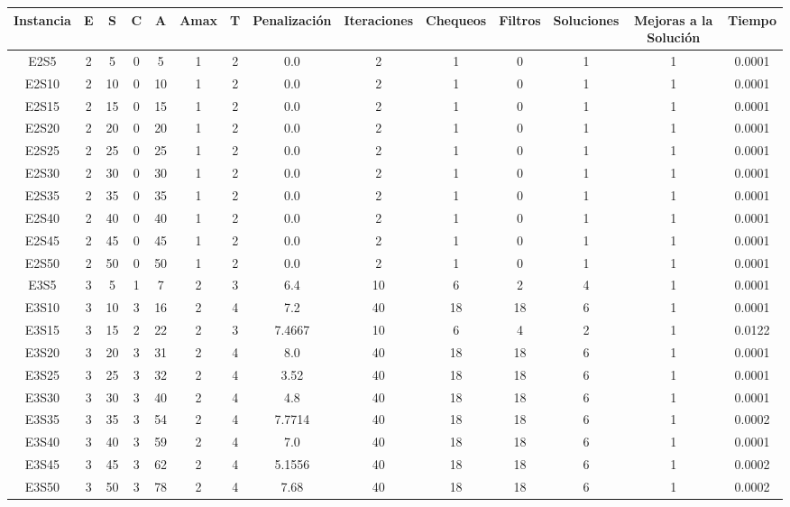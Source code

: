 \documentclass[letter, 10pt]{article}
\begin{document}
\begin{landscape}
\begin{longtable}{|c|c|c|c|c|c|c|c|c|c|c|c|c|c|}

Instancia & E & S & C & A & Amax & T & Penalización & Iteraciones & Chequeos & Filtros & Soluciones & Mejoras a la Solución & Tiempo \\
\hline
E2S5 & 2 & 5 & 0 & 5 & 1 & 2 & 0.0 & 2 & 1 & 0 & 1 & 1 & 0.0001 \\
E2S10 & 2 & 10 & 0 & 10 & 1 & 2 & 0.0 & 2 & 1 & 0 & 1 & 1 & 0.0001 \\
E2S15 & 2 & 15 & 0 & 15 & 1 & 2 & 0.0 & 2 & 1 & 0 & 1 & 1 & 0.0001 \\
E2S20 & 2 & 20 & 0 & 20 & 1 & 2 & 0.0 & 2 & 1 & 0 & 1 & 1 & 0.0001 \\
E2S25 & 2 & 25 & 0 & 25 & 1 & 2 & 0.0 & 2 & 1 & 0 & 1 & 1 & 0.0001 \\
E2S30 & 2 & 30 & 0 & 30 & 1 & 2 & 0.0 & 2 & 1 & 0 & 1 & 1 & 0.0001 \\
E2S35 & 2 & 35 & 0 & 35 & 1 & 2 & 0.0 & 2 & 1 & 0 & 1 & 1 & 0.0001 \\
E2S40 & 2 & 40 & 0 & 40 & 1 & 2 & 0.0 & 2 & 1 & 0 & 1 & 1 & 0.0001 \\
E2S45 & 2 & 45 & 0 & 45 & 1 & 2 & 0.0 & 2 & 1 & 0 & 1 & 1 & 0.0001 \\
E2S50 & 2 & 50 & 0 & 50 & 1 & 2 & 0.0 & 2 & 1 & 0 & 1 & 1 & 0.0001 \\
E3S5 & 3 & 5 & 1 & 7 & 2 & 3 & 6.4 & 10 & 6 & 2 & 4 & 1 & 0.0001 \\
E3S10 & 3 & 10 & 3 & 16 & 2 & 4 & 7.2 & 40 & 18 & 18 & 6 & 1 & 0.0001 \\
E3S15 & 3 & 15 & 2 & 22 & 2 & 3 & 7.4667 & 10 & 6 & 4 & 2 & 1 & 0.0122 \\
E3S20 & 3 & 20 & 3 & 31 & 2 & 4 & 8.0 & 40 & 18 & 18 & 6 & 1 & 0.0001 \\
E3S25 & 3 & 25 & 3 & 32 & 2 & 4 & 3.52 & 40 & 18 & 18 & 6 & 1 & 0.0001 \\
E3S30 & 3 & 30 & 3 & 40 & 2 & 4 & 4.8 & 40 & 18 & 18 & 6 & 1 & 0.0001 \\
E3S35 & 3 & 35 & 3 & 54 & 2 & 4 & 7.7714 & 40 & 18 & 18 & 6 & 1 & 0.0002 \\
E3S40 & 3 & 40 & 3 & 59 & 2 & 4 & 7.0 & 40 & 18 & 18 & 6 & 1 & 0.0001 \\
E3S45 & 3 & 45 & 3 & 62 & 2 & 4 & 5.1556 & 40 & 18 & 18 & 6 & 1 & 0.0002 \\
E3S50 & 3 & 50 & 3 & 78 & 2 & 4 & 7.68 & 40 & 18 & 18 & 6 & 1 & 0.0002 \\

\end{longtable}
\end{landscape}
\end{document}
